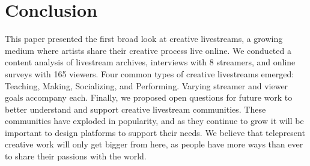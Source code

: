 \section{Conclusion}
This paper presented the first broad look at creative livestreams, a growing medium where artists share their creative process live online. We conducted a content analysis of livestream archives, interviews with 8 streamers, and online surveys with 165 viewers. Four common types of creative livestreams emerged: Teaching, Making, Socializing, and Performing. Varying streamer and viewer goals accompany each. Finally, we proposed open questions for future work to better understand and support creative livestream communities. These communities have exploded in popularity, and as they continue to grow it will be important to design platforms to support their needs. We believe that telepresent creative work will only get bigger from here, as people have more ways than ever to share their passions with the world.